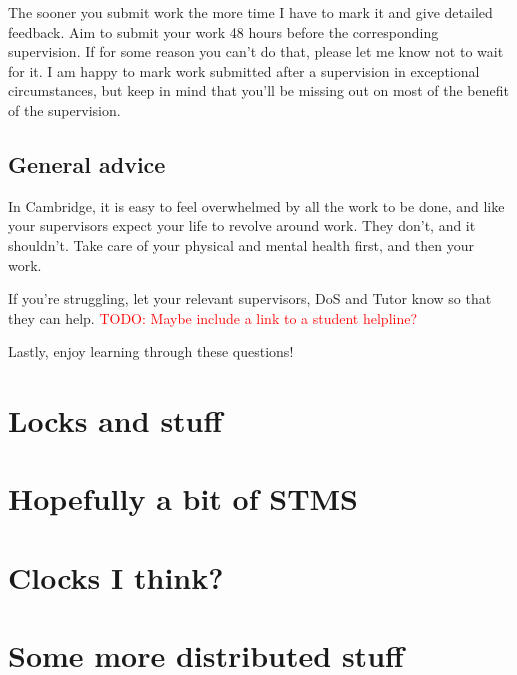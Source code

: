 \documentclass[12pt,a4paper,oneside,openright]{report}
\newcommand{\todo}[1]{\textcolor{red}{TODO: #1}}
\begin{document}
The sooner you submit work the more time I have to mark it and give
detailed feedback. Aim to submit your work 48 hours before the
corresponding supervision. If for some reason you can't do that,
please let me know not to wait for it. I am happy to mark work
submitted after a supervision in exceptional circumstances, but keep
in mind that you'll be missing out on most of the benefit of the
supervision.

\section*{General advice}

In Cambridge, it is easy to feel overwhelmed by all the work to be
done, and like your supervisors expect your life to revolve around
work. They don't, and it shouldn't. Take care of your physical and
mental health first, and then your work.

If you're struggling, let your relevant supervisors, DoS and Tutor know
so that they can help. \todo{Maybe include a link to a student
  helpline?}

Lastly, enjoy learning through these questions!

\newpage

\tableofcontents



\chapter{Locks and stuff}
\pagestyle{headings} 

\chapter{Hopefully a bit of STMS}

\chapter{Clocks I think?}

\chapter{Some more distributed stuff}
\end{document}
